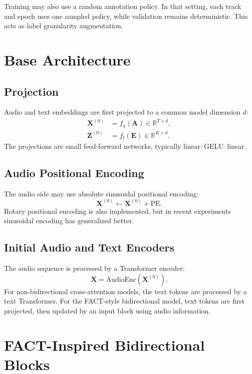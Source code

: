 \documentclass[11pt,a4paper]{article}
\newcommand{\audioseq}{\mathbf{A}}
\newcommand{\textset}{\mathbf{E}}
\newcommand{\audiohid}{\mathbf{X}}
\newcommand{\texthid}{\mathbf{Z}}
\begin{document}
Training may also use a random annotation policy. In that setting, each track and epoch
uses one sampled policy, while validation remains deterministic. This acts as label
granularity augmentation.

\section{Base Architecture}

\subsection{Projection}

Audio and text embeddings are first projected to a common model dimension $d$:
\begin{align}
  \audiohid^{(0)} &= f_a(\audioseq) \in \mathbb{R}^{T \times d}, \\
  \texthid^{(0)} &= f_t(\textset) \in \mathbb{R}^{K \times d}.
\end{align}
The projections are small feed-forward networks, typically linear--GELU--linear.

\subsection{Audio Positional Encoding}

The audio side may use absolute sinusoidal positional encoding:
\begin{equation}
  \audiohid^{(0)} \leftarrow \audiohid^{(0)} + \mathrm{PE}.
\end{equation}
Rotary positional encoding is also implemented, but in recent experiments sinusoidal
encoding has generalized better.

\subsection{Initial Audio and Text Encoders}

The audio sequence is processed by a Transformer encoder:
\begin{equation}
  \audiohid = \mathrm{AudioEnc}(\audiohid^{(0)}).
\end{equation}
For non-bidirectional cross-attention models, the text tokens are processed by a text
Transformer. For the FACT-style bidirectional model, text tokens are first projected,
then updated by an input block using audio information.

\section{FACT-Inspired Bidirectional Blocks}
\end{document}
